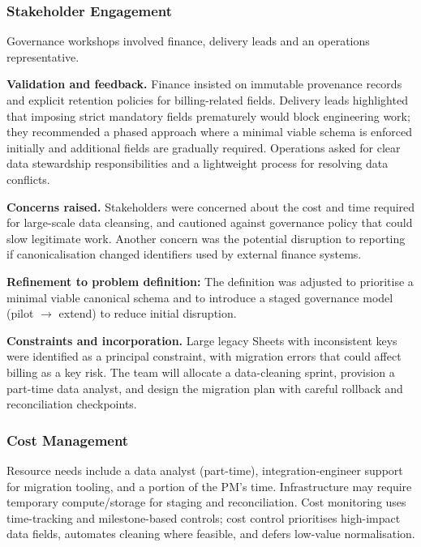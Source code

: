 \documentclass[12pt,a4paper]{report}
\begin{document}
\subsubsection{Stakeholder Engagement}
Governance workshops involved finance, delivery leads and an operations representative.

\textbf{Validation and feedback.} Finance insisted on immutable provenance records and explicit retention policies for billing-related fields. Delivery leads highlighted that imposing strict mandatory fields prematurely would block engineering work; they recommended a phased approach where a minimal viable schema is enforced initially and additional fields are gradually required. Operations asked for clear data stewardship responsibilities and a lightweight process for resolving data conflicts.

\textbf{Concerns raised.} Stakeholders were concerned about the cost and time required for large-scale data cleansing, and cautioned against governance policy that could slow legitimate work. Another concern was the potential disruption to reporting if canonicalisation changed identifiers used by external finance systems.

\begin{noteBox}
\textbf{Refinement to problem definition:} The definition was adjusted to prioritise a minimal viable canonical schema and to introduce a staged governance model (pilot $\rightarrow$ extend) to reduce initial disruption.
\end{noteBox}

\textbf{Constraints and incorporation.} Large legacy Sheets with inconsistent keys were identified as a principal constraint, with migration errors that could affect billing as a key risk. The team will allocate a data-cleaning sprint, provision a part-time data analyst, and design the migration plan with careful rollback and reconciliation checkpoints.

\subsubsection{Cost Management}
Resource needs include a data analyst (part-time), integration-engineer support for migration tooling, and a portion of the PM's time. Infrastructure may require temporary compute/storage for staging and reconciliation. Cost monitoring uses time-tracking and milestone-based controls; cost control prioritises high-impact data fields, automates cleaning where feasible, and defers low-value normalisation.
\end{document}
